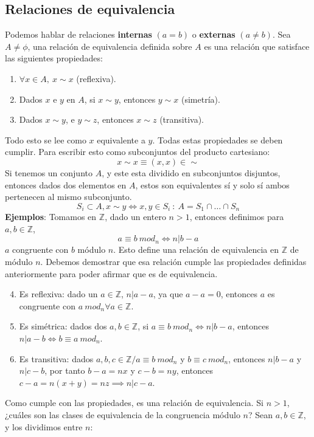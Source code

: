 \documentclass{../Topologia.tex}
\begin{document}
\subsection{Relaciones de equivalencia}
Podemos hablar de relaciones \textbf{internas} $(a=b)$ o \textbf{externas} $(a \neq b)$.
Sea $A \neq \phi$, una relación de equivalencia definida sobre $A$ es una relación que satisface las siguientes propiedades:
\begin{enumerate}
    \item $\forall x \in A,~x \sim x$ (reflexiva).
    \item Dados $x$ e $y$ en $A$, si $x\sim y$, entonces $y \sim x$ (simetría).
    \item Dados $x\sim y$, e $y \sim z$, entonces $x \sim z$ (transitiva).
\end{enumerate}
Todo esto se lee como $x$ equivalente a $y$. Todas estas propiedades se deben cumplir.
Para escribir esto como subconjuntos del producto cartesiano:
$$
x \sim x \equiv (x,x) \in \sim
$$
Si tenemos un conjunto $A$, y este esta dividido en subconjuntos disjuntos, entonces dados dos elementos en $A$, estos son equivalentes sí y solo sí ambos pertenecen al mismo subconjunto.
$$
S_{i} \subset A, x \sim y \iff x,y \in S_{i}~ :~ A = S_{1} \cap\dots \cap S_{n}
$$
\textbf{Ejemplos}:
Tomamos en $\mathbb{Z}$, dado un entero $n>1$, entonces definimos para $a,b \in \mathbb{Z}$,
$$
a \equiv b ~ mod_{n} \iff n | b -a
$$
$a$ congruente con $b$ módulo $n$.
Esto define una relación de equivalencia en $\mathbb{Z}$ de módulo $n$.
Debemos demostrar que esa relación cumple las propiedades definidas anteriormente para poder afirmar que es de equivalencia.
\begin{enumerate}
\setcounter{enumi}{3}
    \item Es reflexiva: dado un $a \in \mathbb{Z}$, $n | a-a$, ya que $a-a = 0$, entonces $a$ es congruente con $a ~ mod_{n} \forall a \in \mathbb{Z}$.
    \item Es simétrica: dados dos $a,b \in \mathbb{Z}$, si $a \equiv b ~mod_{n} \iff n|b-a$, entonces $n |a-b \iff b \equiv a ~mod_{n}$.
    \item Es transitiva: dados $a,b,c \in \mathbb{Z} / a \equiv b~ mod_{n}$ y $b \equiv c ~ mod_{n}$, entonces $n |b-a$ y $n|c-b$, por tanto $b-a = nx$ y $c-b = ny$, entonces $c-a=n(x+y)=nz \implies n |c-a$.
\end{enumerate}
Como cumple con las propiedades, es una relación de equivalencia.
Si $n>1$, ¿cuáles son las clases de equivalencia de la congruencia módulo $n$?
Sean $a,b\in \mathbb{Z}$, y los dividimos entre $n$:
\end{document}
